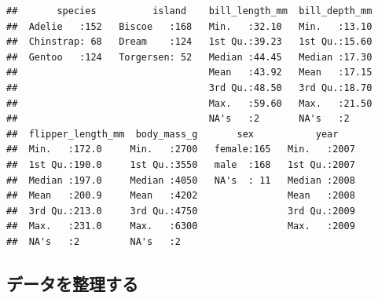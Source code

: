 \documentclass[
]{ltjsarticle}
\begin{document}
\begin{verbatim}
##       species          island    bill_length_mm  bill_depth_mm  
##  Adelie   :152   Biscoe   :168   Min.   :32.10   Min.   :13.10  
##  Chinstrap: 68   Dream    :124   1st Qu.:39.23   1st Qu.:15.60  
##  Gentoo   :124   Torgersen: 52   Median :44.45   Median :17.30  
##                                  Mean   :43.92   Mean   :17.15  
##                                  3rd Qu.:48.50   3rd Qu.:18.70  
##                                  Max.   :59.60   Max.   :21.50  
##                                  NA's   :2       NA's   :2      
##  flipper_length_mm  body_mass_g       sex           year     
##  Min.   :172.0     Min.   :2700   female:165   Min.   :2007  
##  1st Qu.:190.0     1st Qu.:3550   male  :168   1st Qu.:2007  
##  Median :197.0     Median :4050   NA's  : 11   Median :2008  
##  Mean   :200.9     Mean   :4202                Mean   :2008  
##  3rd Qu.:213.0     3rd Qu.:4750                3rd Qu.:2009  
##  Max.   :231.0     Max.   :6300                Max.   :2009  
##  NA's   :2         NA's   :2
\end{verbatim}

\hypertarget{ux30c7ux30fcux30bfux3092ux6574ux7406ux3059ux308b}{%
\subsection{データを整理する}\label{ux30c7ux30fcux30bfux3092ux6574ux7406ux3059ux308b}}
\end{document}
